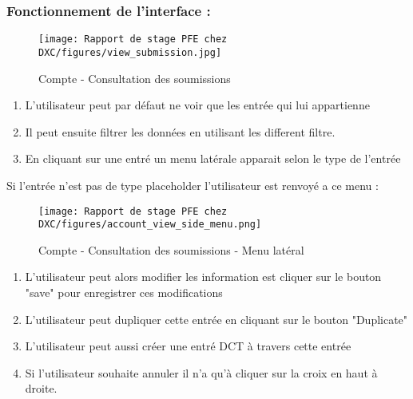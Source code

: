 \subsubsection{Fonctionnement de l'interface :}

\begin{figure}[H]
    \centering
    \texttt{[image: Rapport de stage PFE chez DXC/figures/view\_submission.jpg]}
    \caption{Compte - Consultation des soumissions}
\end{figure}

\begin{enumerate}
    
    \item L'utilisateur peut par défaut ne voir que les entrée qui lui appartienne
    \vspace{0.1cm}
    \item Il peut ensuite filtrer les données en utilisant les different filtre.
    \vspace{0.1cm}
    \item En cliquant sur une entré un menu latérale apparait selon le type de l'entrée

\end{enumerate}

Si l'entrée n'est pas de type placeholder l'utilisateur est renvoyé a ce menu : 

\begin{figure}[H]
    \centering
    \texttt{[image: Rapport de stage PFE chez DXC/figures/account\_view\_side\_menu.png]}
    \caption{Compte - Consultation des soumissions - Menu latéral}
\end{figure}

\begin{enumerate}
    
    \item L'utilisateur peut alors modifier les information est cliquer sur le bouton "save" pour enregistrer ces modifications
    \vspace{0.1cm}
    \item L'utilisateur peut dupliquer cette entrée en cliquant sur le bouton "Duplicate"
    \vspace{0.1cm}
    \item L'utilisateur peut aussi créer une entré DCT à travers cette entrée
    \item Si l'utilisateur souhaite annuler il n'a qu'à cliquer sur la croix en haut à droite.

\end{enumerate}

